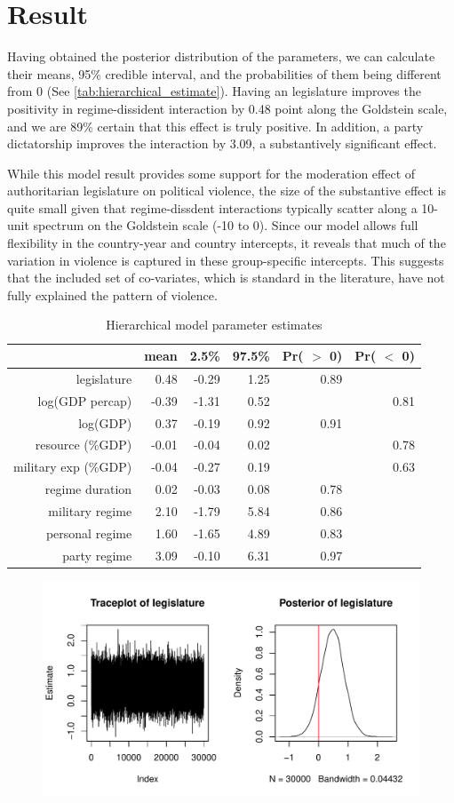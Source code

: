\section{Result}

Having obtained the posterior distribution of the parameters, we can calculate their means, 95\% credible interval, and the probabilities of them being different from 0 (See \autoref{tab:hierarchical_estimate}). Having an legislature improves the positivity in regime-dissident interaction by 0.48 point along the Goldstein scale, and we are 89\% certain that this effect is truly positive. In addition, a party dictatorship improves the interaction by 3.09, a substantively significant effect.

While this model result provides some support for the moderation effect of authoritarian legislature on political violence, the size of the substantive effect is quite small given that regime-dissdent interactions typically scatter along a 10-unit spectrum on the Goldstein scale (-10 to 0). Since our model allows full flexibility in the country-year and country intercepts, it reveals that much of the variation in violence is captured in these group-specific intercepts. This suggests that the included set of co-variates, which is standard in the literature, have not fully explained the pattern of violence.

\begin{table}[H]
\centering
\begin{tabular}{rrrrrr}
  \hline
 & mean & 2.5\% & 97.5\% & Pr( $>$ 0) & Pr( $<$ 0) \\ 
  \hline
legislature & 0.48 & -0.29 & 1.25 & 0.89 &  \\ 
  log(GDP percap) & -0.39 & -1.31 & 0.52 &  & 0.81 \\ 
  log(GDP) & 0.37 & -0.19 & 0.92 & 0.91 &  \\ 
  resource (\%GDP) & -0.01 & -0.04 & 0.02 &  & 0.78 \\ 
  military exp (\%GDP) & -0.04 & -0.27 & 0.19 &  & 0.63 \\ 
  regime duration & 0.02 & -0.03 & 0.08 & 0.78 &  \\ 
  military regime & 2.10 & -1.79 & 5.84 & 0.86 &  \\ 
  personal regime & 1.60 & -1.65 & 4.89 & 0.83 &  \\ 
  party regime & 3.09 & -0.10 & 6.31 & 0.97 &  \\ 
   \hline
\end{tabular}
\caption{Hierarchical model parameter estimates}
\label{tab:hierarchical_estimate}
\end{table}

\begin{figure}[ht]
    \centering
    \includegraphics[width=\textwidth]{../fig/mcmc_legis}
    \label{fig:mcmc_legis}
\end{figure}
